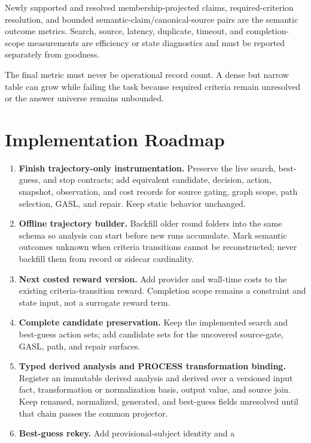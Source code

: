 \documentclass[11pt]{article}
\newcommand{\code}[1]{\path{#1}}
\begin{document}
Newly supported and resolved membership-projected claims,
required-criterion resolution, and bounded semantic-claim/canonical-source
pairs are the semantic outcome metrics.  Search, source,
latency, duplicate, timeout, and completion-scope measurements are efficiency
or state diagnostics and must be reported separately from goodness.

The final metric must never be operational record count.  A dense but narrow
table can grow while failing the task because required criteria remain
unresolved or the answer universe remains unbounded.

\section{Implementation Roadmap}

\begin{enumerate}
  \item \textbf{Finish trajectory-only instrumentation.}  Preserve the live
  search, best-guess, and stop contracts; add equivalent candidate, decision,
  action, snapshot, observation, and cost records for source gating, graph
  scope, path selection, GASL, and repair.  Keep static behavior unchanged.
  \item \textbf{Offline trajectory builder.}  Backfill older round folders into
  the same schema so analysis can start before new runs accumulate.  Mark
  semantic outcomes unknown when criteria transitions cannot be reconstructed;
  never backfill them from record or sidecar cardinality.
  \item \textbf{Next costed reward version.}  Add provider and wall-time costs
  to the existing criteria-transition reward.  Completion scope remains a
  constraint and state input, not a surrogate reward term.
  \item \textbf{Complete candidate preservation.}  Keep the implemented search
  and best-guess action sets; add candidate sets for the uncovered source-gate,
  GASL, path, and repair surfaces.
  \item \textbf{Typed derived analysis and PROCESS transformation binding.}
  Register an immutable derived analysis and derived \code{FieldAssertion}
  over a versioned input fact, transformation or normalization basis, output
  value, and source join.  Keep renamed, normalized, generated, and best-guess
  fields unresolved until that chain passes the common projector.
  \item \textbf{Best-guess rekey.}  Add provisional-subject identity and a

\end{enumerate}
\end{document}
